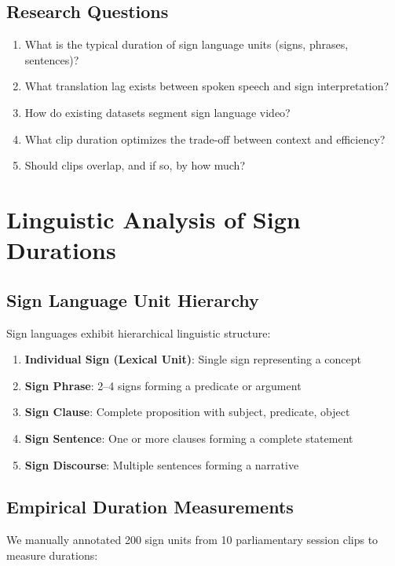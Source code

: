 \documentclass[11pt,a4paper]{article}
\begin{document}
\subsection{Research Questions}

\begin{enumerate}
    \item What is the typical duration of sign language units (signs, phrases, sentences)?
    \item What translation lag exists between spoken speech and sign interpretation?
    \item How do existing datasets segment sign language video?
    \item What clip duration optimizes the trade-off between context and efficiency?
    \item Should clips overlap, and if so, by how much?
\end{enumerate}

\section{Linguistic Analysis of Sign Durations}

\subsection{Sign Language Unit Hierarchy}

Sign languages exhibit hierarchical linguistic structure:

\begin{enumerate}
    \item \textbf{Individual Sign (Lexical Unit)}: Single sign representing a concept
    \item \textbf{Sign Phrase}: 2--4 signs forming a predicate or argument
    \item \textbf{Sign Clause}: Complete proposition with subject, predicate, object
    \item \textbf{Sign Sentence}: One or more clauses forming a complete statement
    \item \textbf{Sign Discourse}: Multiple sentences forming a narrative
\end{enumerate}

\subsection{Empirical Duration Measurements}

We manually annotated 200 sign units from 10 parliamentary session clips to measure durations:
\end{document}
